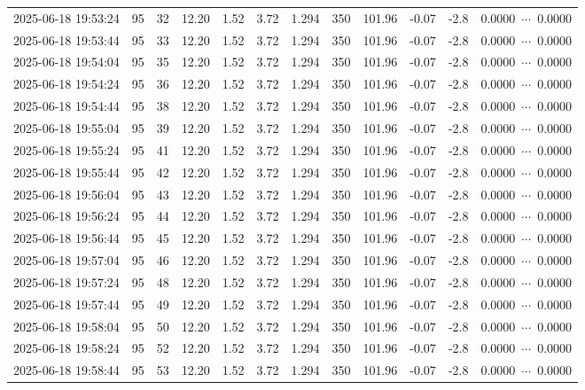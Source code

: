 \documentclass[UTF8,10pt,a4paper,fontset=fandol]{ctexart}
\begin{document}
\begin{center}
\begin{tabular}{|p{1.55cm}|c|c|c|c|c|c|c|c|c|c|p{3.0cm}|}
2025-06-18 19:53:24 & 95 & 32 & 12.20 & 1.52 & 3.72 & 1.294 & 350 & 101.96 & -0.07 & -2.8 & 0.0000\ $\cdots$\ 0.0000 \\
2025-06-18 19:53:44 & 95 & 33 & 12.20 & 1.52 & 3.72 & 1.294 & 350 & 101.96 & -0.07 & -2.8 & 0.0000\ $\cdots$\ 0.0000 \\
2025-06-18 19:54:04 & 95 & 35 & 12.20 & 1.52 & 3.72 & 1.294 & 350 & 101.96 & -0.07 & -2.8 & 0.0000\ $\cdots$\ 0.0000 \\
2025-06-18 19:54:24 & 95 & 36 & 12.20 & 1.52 & 3.72 & 1.294 & 350 & 101.96 & -0.07 & -2.8 & 0.0000\ $\cdots$\ 0.0000 \\
2025-06-18 19:54:44 & 95 & 38 & 12.20 & 1.52 & 3.72 & 1.294 & 350 & 101.96 & -0.07 & -2.8 & 0.0000\ $\cdots$\ 0.0000 \\
2025-06-18 19:55:04 & 95 & 39 & 12.20 & 1.52 & 3.72 & 1.294 & 350 & 101.96 & -0.07 & -2.8 & 0.0000\ $\cdots$\ 0.0000 \\
2025-06-18 19:55:24 & 95 & 41 & 12.20 & 1.52 & 3.72 & 1.294 & 350 & 101.96 & -0.07 & -2.8 & 0.0000\ $\cdots$\ 0.0000 \\
2025-06-18 19:55:44 & 95 & 42 & 12.20 & 1.52 & 3.72 & 1.294 & 350 & 101.96 & -0.07 & -2.8 & 0.0000\ $\cdots$\ 0.0000 \\
2025-06-18 19:56:04 & 95 & 43 & 12.20 & 1.52 & 3.72 & 1.294 & 350 & 101.96 & -0.07 & -2.8 & 0.0000\ $\cdots$\ 0.0000 \\
2025-06-18 19:56:24 & 95 & 44 & 12.20 & 1.52 & 3.72 & 1.294 & 350 & 101.96 & -0.07 & -2.8 & 0.0000\ $\cdots$\ 0.0000 \\
2025-06-18 19:56:44 & 95 & 45 & 12.20 & 1.52 & 3.72 & 1.294 & 350 & 101.96 & -0.07 & -2.8 & 0.0000\ $\cdots$\ 0.0000 \\
2025-06-18 19:57:04 & 95 & 46 & 12.20 & 1.52 & 3.72 & 1.294 & 350 & 101.96 & -0.07 & -2.8 & 0.0000\ $\cdots$\ 0.0000 \\
2025-06-18 19:57:24 & 95 & 48 & 12.20 & 1.52 & 3.72 & 1.294 & 350 & 101.96 & -0.07 & -2.8 & 0.0000\ $\cdots$\ 0.0000 \\
2025-06-18 19:57:44 & 95 & 49 & 12.20 & 1.52 & 3.72 & 1.294 & 350 & 101.96 & -0.07 & -2.8 & 0.0000\ $\cdots$\ 0.0000 \\
2025-06-18 19:58:04 & 95 & 50 & 12.20 & 1.52 & 3.72 & 1.294 & 350 & 101.96 & -0.07 & -2.8 & 0.0000\ $\cdots$\ 0.0000 \\
2025-06-18 19:58:24 & 95 & 52 & 12.20 & 1.52 & 3.72 & 1.294 & 350 & 101.96 & -0.07 & -2.8 & 0.0000\ $\cdots$\ 0.0000 \\
2025-06-18 19:58:44 & 95 & 53 & 12.20 & 1.52 & 3.72 & 1.294 & 350 & 101.96 & -0.07 & -2.8 & 0.0000\ $\cdots$\ 0.0000 \\

\end{tabular}
\end{center}
\end{document}
